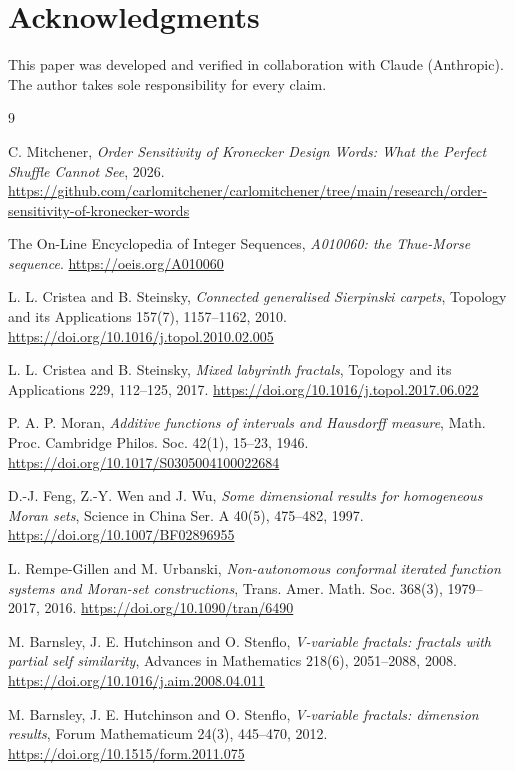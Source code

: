 \documentclass[11pt]{amsart}
\theoremstyle{definition}
\theoremstyle{remark}
\begin{document}
\section*{Acknowledgments}

This paper was developed and verified in collaboration with Claude (Anthropic). The author takes sole responsibility for every claim.

\begin{thebibliography}{9}
\raggedright

C. Mitchener, \emph{Order Sensitivity of Kronecker Design Words: What the Perfect Shuffle Cannot See}, 2026. \url{https://github.com/carlomitchener/carlomitchener/tree/main/research/order-sensitivity-of-kronecker-words}

The On-Line Encyclopedia of Integer Sequences, \emph{A010060: the Thue-Morse sequence}. \url{https://oeis.org/A010060}

L. L. Cristea and B. Steinsky, \emph{Connected generalised Sierpinski carpets}, Topology and its Applications 157(7), 1157--1162, 2010. \url{https://doi.org/10.1016/j.topol.2010.02.005}

L. L. Cristea and B. Steinsky, \emph{Mixed labyrinth fractals}, Topology and its Applications 229, 112--125, 2017. \url{https://doi.org/10.1016/j.topol.2017.06.022}

P. A. P. Moran, \emph{Additive functions of intervals and Hausdorff measure}, Math. Proc. Cambridge Philos. Soc. 42(1), 15--23, 1946. \url{https://doi.org/10.1017/S0305004100022684}

D.-J. Feng, Z.-Y. Wen and J. Wu, \emph{Some dimensional results for homogeneous Moran sets}, Science in China Ser. A 40(5), 475--482, 1997. \url{https://doi.org/10.1007/BF02896955}

L. Rempe-Gillen and M. Urbanski, \emph{Non-autonomous conformal iterated function systems and Moran-set constructions}, Trans. Amer. Math. Soc. 368(3), 1979--2017, 2016. \url{https://doi.org/10.1090/tran/6490}

M. Barnsley, J. E. Hutchinson and O. Stenflo, \emph{V-variable fractals: fractals with partial self similarity}, Advances in Mathematics 218(6), 2051--2088, 2008. \url{https://doi.org/10.1016/j.aim.2008.04.011}

M. Barnsley, J. E. Hutchinson and O. Stenflo, \emph{V-variable fractals: dimension results}, Forum Mathematicum 24(3), 445--470, 2012. \url{https://doi.org/10.1515/form.2011.075}


\end{thebibliography}
\end{document}
